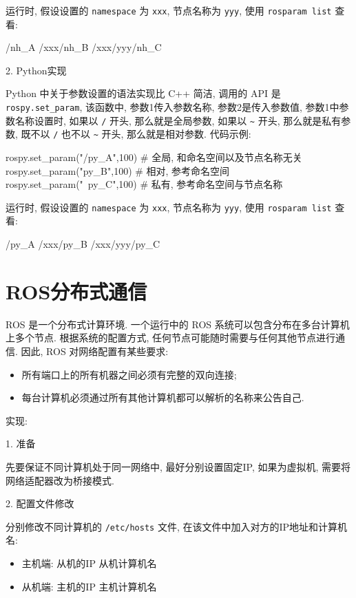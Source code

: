 \documentclass[openany, fontset=windowsold]{ctexbook}
\theoremstyle{kaiti}
\theoremstyle{normal}
\begin{document}
运行时, 假设设置的 \verb|namespace| 为 \verb|xxx|, 节点名称为 \verb|yyy|, 使用 \verb|rosparam list| 查看:

\begin{bash}
  /nh_A
  /xxx/nh_B
  /xxx/yyy/nh_C
\end{bash}

2. Python实现

Python 中关于参数设置的语法实现比 C++ 简洁, 调用的 API 是 \verb|rospy.set_param|, 该函数中, 参数1传入参数名称, 参数2是传入参数值, 参数1中参数名称设置时, 如果以 \verb|/| 开头, 那么就是全局参数, 如果以 \verb|~| 开头, 那么就是私有参数, 既不以 \verb|/| 也不以 \verb|~| 开头, 那么就是相对参数. 代码示例:

\begin{python}
  rospy.set_param("/py_A",100)  # 全局, 和命名空间以及节点名称无关
  rospy.set_param("py_B",100)  # 相对, 参考命名空间
  rospy.set_param("~py_C",100)  # 私有, 参考命名空间与节点名称
\end{python}

运行时, 假设设置的 \verb|namespace| 为 \verb|xxx|, 节点名称为 \verb|yyy|, 使用 \verb|rosparam list| 查看:

\begin{bash}
  /py_A
  /xxx/py_B
  /xxx/yyy/py_C
\end{bash}

\section{ROS分布式通信}

ROS 是一个分布式计算环境. 一个运行中的 ROS 系统可以包含分布在多台计算机上多个节点. 根据系统的配置方式, 任何节点可能随时需要与任何其他节点进行通信. 因此, ROS 对网络配置有某些要求: 

\begin{itemize}
  \item 所有端口上的所有机器之间必须有完整的双向连接;
  \item 每台计算机必须通过所有其他计算机都可以解析的名称来公告自己.
\end{itemize}

实现:

1. 准备

先要保证不同计算机处于同一网络中, 最好分别设置固定IP, 如果为虚拟机, 需要将网络适配器改为桥接模式.

2. 配置文件修改

分别修改不同计算机的 \verb|/etc/hosts| 文件, 在该文件中加入对方的IP地址和计算机名:

\begin{itemize}
  \item 主机端: 从机的IP 从机计算机名
  \item 从机端: 主机的IP 主机计算机名
\end{itemize}
\end{document}
